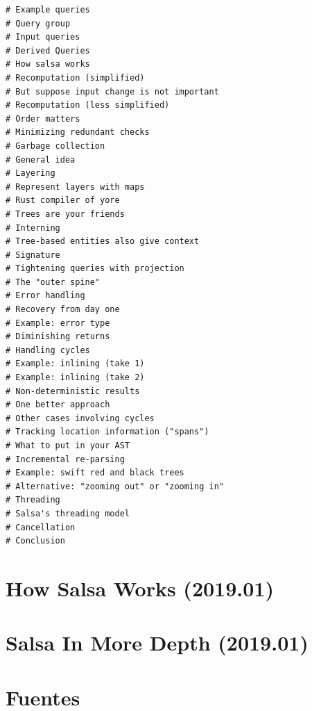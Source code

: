 \documentclass[12pt, a4paper]{report}
\begin{document}
\begin{verbatim}
# Example queries
# Query group
# Input queries
# Derived Queries
# How salsa works
# Recomputation (simplified)
# But suppose input change is not important
# Recomputation (less simplified)
# Order matters
# Minimizing redundant checks
# Garbage collection
# General idea
# Layering
# Represent layers with maps
# Rust compiler of yore
# Trees are your friends
# Interning
# Tree-based entities also give context
# Signature
# Tightening queries with projection
# The "outer spine"
# Error handling
# Recovery from day one
# Example: error type
# Diminishing returns
# Handling cycles
# Example: inlining (take 1)
# Example: inlining (take 2)
# Non-deterministic results
# One better approach
# Other cases involving cycles
# Tracking location information ("spans")
# What to put in your AST
# Incremental re-parsing
# Example: swift red and black trees
# Alternative: "zooming out" or "zooming in"
# Threading
# Salsa's threading model
# Cancellation
# Conclusion

\end{verbatim}

\section*{How Salsa Works (2019.01)}
\cite{niko2019salsaworks}

\section*{Salsa In More Depth (2019.01)}
\cite{niko2019salsadepth}

\section*{Fuentes}
\end{document}
